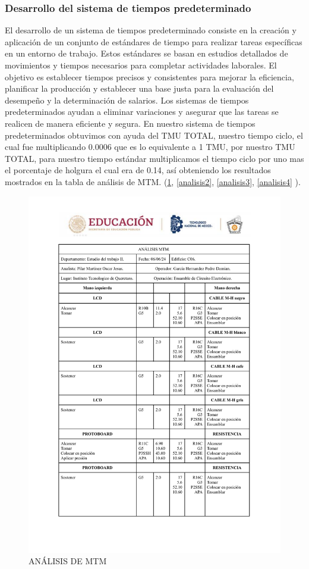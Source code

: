     \subsubsection{Desarrollo del sistema de tiempos predeterminado}
    El desarrollo de un sistema de tiempos predeterminado consiste en la creación y aplicación de un conjunto de estándares de tiempo para realizar tareas específicas en un entorno de trabajo. Estos estándares se basan en estudios detallados de movimientos y tiempos necesarios para completar actividades laborales. El objetivo es establecer tiempos precisos y consistentes para mejorar la eficiencia, planificar la producción y establecer una base justa para la evaluación del desempeño y la determinación de salarios. Los sistemas de tiempos predeterminados ayudan a eliminar variaciones y asegurar que las tareas se realicen de manera eficiente y segura. En nuestro sistema de tiempos predeterminados obtuvimos con ayuda del TMU TOTAL, nuestro tiempo ciclo, el cual fue multiplicando 0.0006 que es lo equivalente a 1 TMU, por nuestro TMU TOTAL, para nuestro tiempo estándar multiplicamos el tiempo ciclo por uno mas el porcentaje de holgura el cual era de 0.14, así obteniendo los resultados mostrados en la tabla de análisis de MTM. (\ref{analisis1}, \ref{analisis2}, \ref{analisis3}, \ref{analisis4} ).
    \begin{figure}
        \centering
    \includegraphics[trim = {0mm 0mm 0mm 0mm},clip,scale=0.3]{24/Img/analisisMTM1.pdf}
    \caption{ANÁLISIS DE MTM}
        \label{analisis1}
    \end{figure}
